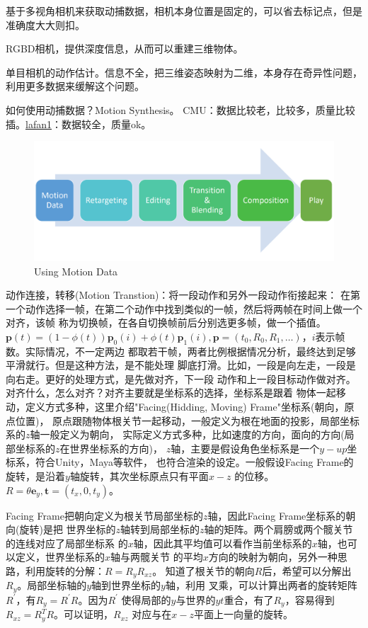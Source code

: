 \documentclass[lang=cn,newtx,10pt,scheme=chinese]{elegantbook}
\begin{document}
基于多视角相机来获取动捕数据，相机本身位置是固定的，可以省去标记点，但是准确度大大则扣。

RGBD相机，提供深度信息，从而可以重建三维物体。

单目相机的动作估计。信息不全，把三维姿态映射为二维，本身存在奇异性问题，
利用更多数据来缓解这个问题。

如何使用动捕数据？Motion Synthesis。 
CMU：数据比较老，比较多，质量比较插。\href{https://paperswithcode.com/dataset/lafan1}{lafan1}：数据较全，质量ok。

\begin{figure}[htbp]
  \centering
  \includegraphics[totalheight=2in]{"./image/UsingMotionData.png"}
  \caption{Using Motion Data} \label{fig:UsingMotionData}
\end{figure}

动作连接，转移(Motion Transtion)：将一段动作和另外一段动作衔接起来：
在第一个动作选择一帧，在第二个动作中找到类似的一帧，然后将两帧在时间上做一个对齐，该帧
称为切换帧，在各自切换帧前后分别选更多帧，做一个插值。$\boldsymbol{p}(t)=
(1-\phi(t))\boldsymbol{p}_0(i) + \phi(t)\boldsymbol{p}_1(i), 
\boldsymbol{p}=(t_0, R_0, R_1, \dots)$，$i$表示帧数。实际情况，不一定两边
都取若干帧，两者比例根据情况分析，最终达到足够平滑就行。但是这种方法，是不能处理
脚底打滑。比如，一段是向左走，一段是向右走。更好的处理方式，是先做对齐，下一段
动作和上一段目标动作做对齐。对齐什么，怎么对齐？对齐主要就是坐标系的选择，坐标系是跟着
物体一起移动，定义方式多种，这里介绍"Facing(Hidding, Moving) Frame"坐标系(朝向，原点位置)，
原点跟随物体根关节一起移动，一般定义为根在地面的投影，局部坐标系的$z$轴一般定义为朝向，
实际定义方式多种，比如速度的方向，面向的方向(局部坐标系的$z$在世界坐标系的方向)，
$z$轴，主要是假设角色坐标系是一个$y-up$坐标系，符合Unity，Maya等软件，
也符合渲染的设定。一般假设Facing Frame的旋转，是沿着$y$轴旋转，其次坐标原点只有平面$x-z$
的位移。$R=\theta \boldsymbol{e}_y, \boldsymbol{t}=(t_x, 0, t_y)$。

Facing Frame把朝向定义为根关节局部坐标的$z$轴，因此Facing Frame坐标系的朝向(旋转)是把
世界坐标的$z$轴转到局部坐标的$z$轴的矩阵。两个肩膀或两个髋关节的连线对应了局部坐标系
的$x$轴，因此其平均值可以看作当前坐标系的$x$轴，也可以定义，世界坐标系的$x$轴与两髋关节
的平均$x$方向的映射为朝向，另外一种思路，利用旋转的分解：$R=R_y R_{xz}$。
知道了根关节的朝向$R$后，希望可以分解出$R_y$。局部坐标轴的$y$轴到世界坐标的$y$轴，利用
叉乘，可以计算出两者的旋转矩阵$R^{\prime}$，有$R_y=R^{\prime}R$。因为$R^{\prime}$
使得局部的$y$与世界的$yt$重合，有了$R_y$，容易得到$R_{xz}=R^{T}_y R$。可以证明，$R_{xz}$
对应与在$x-z$平面上一向量的旋转。
\end{document}
